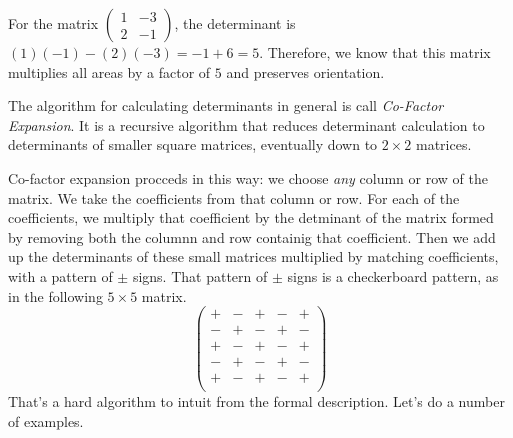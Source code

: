 \documentclass[fleqn]{report}
\begin{document}
\begin{example}
For the matrix $\left( \begin{matrix} 1 & -3 \\ 2 & -1
\end{matrix} \right)$, the determinant is $(1)(-1) - (2)(-3) =
-1 + 6 = 5$. Therefore, we know that this matrix multiplies
all areas by a factor of $5$ and preserves orientation.
\end{example}

\begin{defn}
The algorithm for calculating determinants in general is call
\emph{Co-Factor Expansion}. It is a recursive algorithm that
reduces determinant calculation to determinants of smaller
square matrices, eventually down to $2 \times 2$ matrices.
\end{defn}

Co-factor expansion procceds in this way: we choose \emph{any}
column or row of the matrix. We take the coefficients from
that column or row. For each of the coefficients, we multiply
that coefficient by the detminant of the matrix formed by
removing both the columnn and row containig that coefficient.
Then we add up the determinants of these small matrices
multiplied by matching coefficients, with a pattern of $\pm$
signs. That pattern of $\pm$ signs is a checkerboard pattern,
as in the following $5 \times 5$ matrix.
\begin{equation*}
\left( \begin{matrix}
+ & - & + & - & + \\
- & + & - & + & - \\
+ & - & + & - & + \\
- & + & - & + & - \\
+ & - & + & - & + \\
\end{matrix} \right) 
\end{equation*}
That's a hard algorithm to intuit from the formal description.
Let's do a number of examples. 
\end{document}
